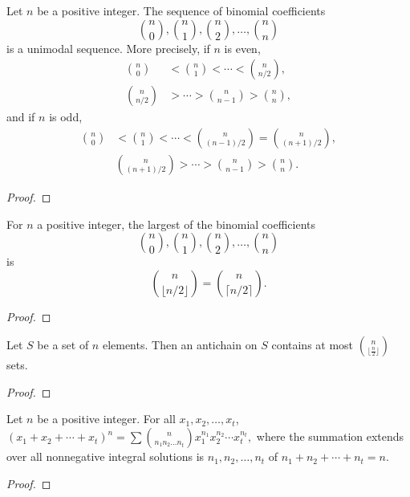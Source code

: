 \begin{theorem}
    \label{thm:5.3.1}
Let \( n \) be a positive integer. The sequence of binomial coefficients
\[
\binom{n}{0}, \binom{n}{1}, \binom{n}{2}, \ldots, \binom{n}{n}
\]
is a unimodal sequence. More precisely, if \( n \) is even,
\begin{align*}
\binom{n}{0} &< \binom{n}{1} < \cdots < \binom{n}{n/2}, \\
\binom{n}{n/2} &> \cdots > \binom{n}{n-1} > \binom{n}{n},
\end{align*}
and if \( n \) is odd,
\begin{align*}
\binom{n}{0} &< \binom{n}{1} < \cdots < \binom{n}{(n-1)/2} = \binom{n}{(n+1)/2}, \\
&\binom{n}{(n+1)/2} > \cdots > \binom{n}{n-1} > \binom{n}{n}.
\end{align*}
\end{theorem} 
\begin{proof}  
\end{proof}

\begin{corollary}
    \label{cor:5.3.2}
For \( n \) a positive integer, the largest of the binomial coefficients
\[
\binom{n}{0}, \binom{n}{1}, \binom{n}{2}, \ldots, \binom{n}{n}
\]
is
\[
\binom{n}{\lfloor n/2 \rfloor} = \binom{n}{\lceil n/2 \rceil}.
\]
\end{corollary}
\begin{proof}
\end{proof}


\begin{theorem}
    \label{thm:5.3.3}
Let \( S \) be a set of \( n \) elements. Then an antichain on \( S \) contains at most \( \binom{n}{\lfloor \frac{n}{2} \rfloor} \) sets.
\end{theorem}
\begin{proof}
\end{proof}



\begin{theorem}
    \label{thm:5.4.1}
Let \( n \) be a positive integer. For all \( x_1, x_2, \ldots, x_t \),
$
(x_1 + x_2 + \cdots + x_t)^n = \sum \binom{n}{n_1n_2\ldots n_t} x_1^{n_1} x_2^{n_2} \cdots x_t^{n_t},
$
where the summation extends over all nonnegative integral solutions is \( n_1, n_2, \ldots, n_t \) of \( n_1 + n_2 + \cdots + n_t = n \).
\end{theorem}
\begin{proof}  
\end{proof}


